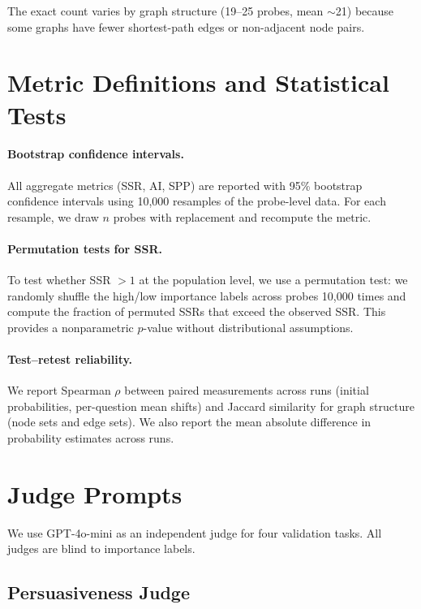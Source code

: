\documentclass[11pt]{article}
\begin{document}
The exact count varies by graph structure (19--25 probes, mean ${\sim}$21) because some graphs have fewer shortest-path edges or non-adjacent node pairs.

\section{Metric Definitions and Statistical Tests}
\label{app:metrics}

\paragraph{Bootstrap confidence intervals.} All aggregate metrics (SSR, AI, SPP) are reported with 95\% bootstrap confidence intervals using 10,000 resamples of the probe-level data. For each resample, we draw $n$ probes with replacement and recompute the metric.

\paragraph{Permutation tests for SSR.} To test whether SSR $> 1$ at the population level, we use a permutation test: we randomly shuffle the high/low importance labels across probes 10,000 times and compute the fraction of permuted SSRs that exceed the observed SSR. This provides a nonparametric $p$-value without distributional assumptions.

\paragraph{Test--retest reliability.} We report Spearman $\rho$ between paired measurements across runs (initial probabilities, per-question mean shifts) and Jaccard similarity for graph structure (node sets and edge sets). We also report the mean absolute difference in probability estimates across runs.

\section{Judge Prompts}
\label{app:judge-prompts}

We use GPT-4o-mini as an independent judge for four validation tasks. All judges are blind to importance labels.

\subsection{Persuasiveness Judge}
\label{app:prompt-persuasiveness}
\end{document}

